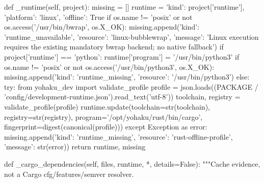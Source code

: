    def _runtime(self, project):
        missing = []
        runtime = {'kind': project['runtime'], 'platform': 'linux', 'offline': True}
        if os.name != 'posix' or not os.access('/usr/bin/bwrap', os.X_OK):
            missing.append({'kind': 'runtime_unavailable', 'resource': 'linux-bubblewrap',
                            'message': 'Linux execution requires the existing mandatory bwrap backend; no native fallback'})
        if project['runtime'] == 'python':
            runtime['program'] = '/usr/bin/python3'
            if os.name != 'posix' or not os.access('/usr/bin/python3', os.X_OK):
                missing.append({'kind': 'runtime_missing', 'resource': '/usr/bin/python3'})
        else:
            try:
                from yohaku_dev import validate_profile
                profile = json.loads((PACKAGE / 'config/development-runtime.json').read_text('utf-8'))
                toolchain, registry = validate_profile(profile)
                runtime.update(toolchain=str(toolchain), registry=str(registry),
                               program='/opt/yohaku/rust/bin/cargo',
                               fingerprint=digest(canonical(profile)))
            except Exception as error:
                missing.append({'kind': 'runtime_missing', 'resource': 'rust-offline-profile', 'message': str(error)})
        return runtime, missing

    def _cargo_dependencies(self, files, runtime, *, details=False):
        """Cache evidence, not a Cargo cfg/features/semver resolver.

